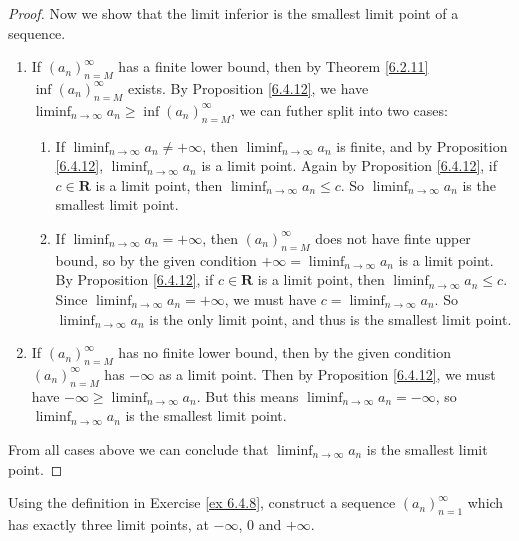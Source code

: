 \begin{proof}
    Now we show that the limit inferior is the smallest limit point of a sequence.
    \begin{enumerate}
        \item If \((a_n)_{n = M}^\infty\) has a finite lower bound, then by Theorem \ref{6.2.11} \(\inf(a_n)_{n = M}^\infty\) exists.
              By Proposition \ref{6.4.12}, we have \(\liminf_{n \to \infty} a_n \geq \inf(a_n)_{n = M}^\infty\), we can futher split into two cases:
              \begin{enumerate}[label=(\Roman*)]
                  \item If \(\liminf_{n \to \infty} a_n \neq +\infty\), then \(\liminf_{n \to \infty} a_n\) is finite, and by Proposition \ref{6.4.12}, \(\liminf_{n \to \infty} a_n\) is a limit point.
                        Again by Proposition \ref{6.4.12}, if \(c \in \mathbf{R}\) is a limit point, then \(\liminf_{n \to \infty} a_n \leq c\).
                        So \(\liminf_{n \to \infty} a_n\) is the smallest limit point.
                  \item If \(\liminf_{n \to \infty} a_n = +\infty\), then \((a_n)_{n = M}^\infty\) does not have finte upper bound, so by the given condition \(+\infty = \liminf_{n \to \infty} a_n\) is a limit point.
                        By Proposition \ref{6.4.12}, if \(c \in \mathbf{R}\) is a limit point, then \(\liminf_{n \to \infty} a_n \leq c\).
                        Since \(\liminf_{n \to \infty} a_n = +\infty\), we must have \(c = \liminf_{n \to \infty} a_n\).
                        So \(\liminf_{n \to \infty} a_n\) is the only limit point, and thus is the smallest limit point.
              \end{enumerate}
        \item If \((a_n)_{n = M}^\infty\) has no finite lower bound, then by the given condition \((a_n)_{n = M}^\infty\) has \(-\infty\) as a limit point.
              Then by Proposition \ref{6.4.12}, we must have \(-\infty \geq \liminf_{n \to \infty} a_n\).
              But this means \(\liminf_{n \to \infty} a_n = -\infty\), so \(\liminf_{n \to \infty} a_n\) is the smallest limit point.
    \end{enumerate}
    From all cases above we can conclude that \(\liminf_{n \to \infty} a_n\) is the smallest limit point.
\end{proof}

\begin{exercise}\label{ex 6.4.9}
    Using the definition in Exercise \ref{ex 6.4.8}, construct a sequence \((a_n)_{n = 1}^\infty\) which has exactly three limit points, at \(-\infty\), \(0\) and \(+\infty\).
\end{exercise}

